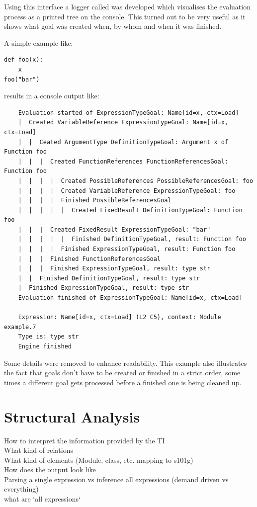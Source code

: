 \documentclass[12pt,halfparskip,DIV11,BCOR10mm]{scrreprt}
\begin{document}
Using this interface a logger called  was developed which visualises the evaluation process as a printed tree on the console. This turned out to be very useful as it shows what goal was created when, by whom and when it was finished. 

A simple example like:
\begin{lstlisting}
def foo(x):
    x
foo("bar")
\end{lstlisting}

results in a console output like:
\begin{verbatim}
	Evaluation started of ExpressionTypeGoal: Name[id=x, ctx=Load]
	|  Created VariableReference ExpressionTypeGoal: Name[id=x, ctx=Load]
	|  |  Ceated ArgumentType DefinitionTypeGoal: Argument x of Function foo
	|  |  |  Created FunctionReferences FunctionReferencesGoal: Function foo
	|  |  |  |  Created PossibleReferences PossibleReferencesGoal: foo
	|  |  |  |  Created VariableReference ExpressionTypeGoal: foo
	|  |  |  |  Finished PossibleReferencesGoal
	|  |  |  |  |  Created FixedResult DefinitionTypeGoal: Function foo
	|  |  |  Created FixedResult ExpressionTypeGoal: "bar"
	|  |  |  |  |  Finished DefinitionTypeGoal, result: Function foo
	|  |  |  |  Finished ExpressionTypeGoal, result: Function foo
	|  |  |  Finished FunctionReferencesGoal
	|  |  |  Finished ExpressionTypeGoal, result: type str
	|  |  Finished DefinitionTypeGoal, result: type str
	|  Finished ExpressionTypeGoal, result: type str
	Evaluation finished of ExpressionTypeGoal: Name[id=x, ctx=Load]

	Expression: Name[id=x, ctx=Load] (L2 C5), context: Module example.7
	Type is: type str
	Engine finished
\end{verbatim}

Some details were removed to enhance readability. This example also illustrates the fact that goals don't have to be created or finished in a strict order, some times a different goal gets processed before a finished one is being cleaned up.




\chapter{Structural Analysis}

How to interpret the information provided by the TI \\
What kind of relations \\
What kind of elements (Module, class, etc. mapping to s101g) \\
How does the output look like \\
Parsing a single expression vs inference all expressions (demand driven vs everything)\\
 what are `all expressions`
\end{document}
